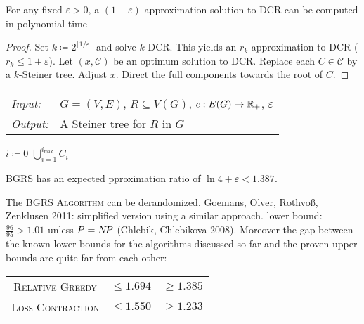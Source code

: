 \documentclass[../skript.tex]{subfiles}
\begin{document}
\begin{lemma} %
\label{thm:81}
For any fixed $\varepsilon > 0$, a $(1 + \varepsilon)$-approximation solution to DCR can be computed in polynomial time
\end{lemma}
\begin{proof}
Set $k \coloneqq 2^{\lceil 1/\varepsilon \rceil}$ and solve $k$-DCR. This yields an $r_k$-approximation to DCR ($r_k \leq 1 + \varepsilon$).
Let $(x, \mathscr{C})$ be an optimum solution to DCR. Replace each $C \in \mathscr{C}$ by a $k$-Steiner tree. Adjust $x$.
Direct the full components towards the root of $C$.
\end{proof}
\begin{algorithmbox}
\begin{tabular}{@{}ll}
\textit{Input:} & $G = (V, E)$, $R \subseteq V(G)$, $c : E(G) \to \mathbb{R}_+$, $\varepsilon$\\
\textit{Output:} & A Steiner tree for $R$ in $G$
\end{tabular}
\end{algorithmbox}
\vspace{-7pt}
\begin{algorithm}[H]
$i \coloneqq 0$\;
\;
\Return $\bigcup_{i=1}^{i_{\max}} C_i$\;
\end{algorithm}
\vspace{-7pt}
\EndAlgorithmLine
\begin{theorem} %
BGRS has an expected pproximation ratio of $\ln 4 + \varepsilon < 1.387$.
\end{theorem}
The \textsc{BGRS Algorithm} can be derandomized.
Goemans, Olver, Rothvoß, Zenklusen \lbrack{}2011\rbrack{}: simplified version using a similar approach.
lower bound: $\frac{96}{95} > 1.01$ unless $P = N \! P$ (Chlebik, Chlebikova \lbrack{}2008\rbrack{}). Moreover the gap between the known lower bounds for the algorithms discussed so far and the proven upper bounds are quite far from each other:
\begin{center}
\begin{tabular}{ccc}
\textsc{Relative Greedy} & ${} \leq 1.694$ & ${} \geq 1.385$ \\
\textsc{Loss Contraction} & ${} \leq 1.550$ & ${} \geq 1.233$
\end{tabular}
\end{center}
\end{document}

